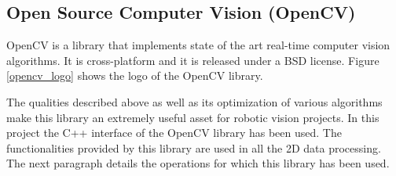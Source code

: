 
			







	\subsection{Open Source Computer Vision (OpenCV)}
	\label{opencv}

	OpenCV \cite{opencv} is a library that implements state of the art real-time computer vision 
	algorithms. 
	It is cross-platform and it is released under a BSD \cite{BSD} license. 
	Figure \ref{opencv_logo} shows the logo of the OpenCV library. 


	The qualities described above as well as its optimization of various algorithms make this library an extremely useful asset for robotic vision projects. 
	In this project the C++ interface of the OpenCV library has been used. 
	The functionalities provided by this library are used in all the 2D data processing. 
	The next paragraph details the operations for which this library has been used. 

